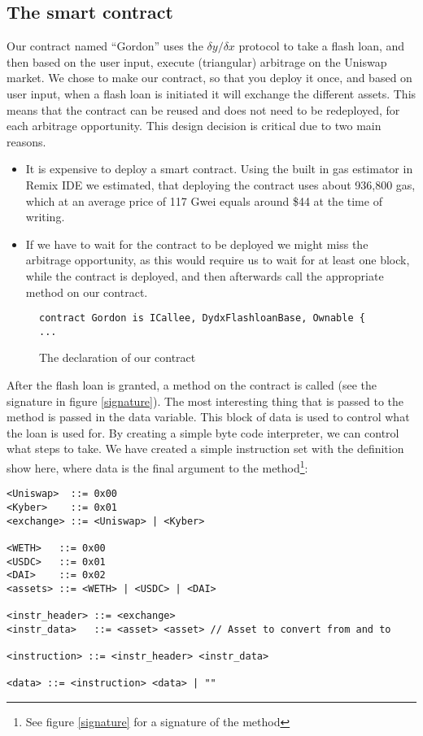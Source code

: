 \subsection{The smart contract}
Our contract named ``Gordon'' uses the $\delta y/\delta x$ protocol to take a
flash loan, and then based on the user input, execute (triangular) arbitrage on
the Uniswap market. We chose to make our contract, so that you deploy it once,
and based on user input, when a flash loan is initiated it will exchange the
different assets. This means that the contract can be reused and does not need
to be redeployed, for each arbitrage opportunity. This design decision is
critical due to two main reasons.
\begin{itemize}
    \item It is expensive to deploy a smart contract. Using the built in gas
        estimator in Remix IDE we estimated, that deploying the contract uses
        about 936,800 gas, which at an average price of 117 Gwei equals around
        \$44 at the time of writing.
    \item If we have to wait for the contract to be deployed we might miss the
        arbitrage opportunity, as this would require us to wait for at least one
        block, while the contract is deployed, and then afterwards call the
        appropriate method on our contract.
\end{itemize}

\begin{figure}[h]
    \begin{lstlisting}[language=Solidity]
    contract Gordon is ICallee, DydxFlashloanBase, Ownable { ...\end{lstlisting}
    \caption{The declaration of our contract}
    \label{fig-gordon}
\end{figure}

\noindent After the flash loan is granted, a method on the contract is called (see the
signature in figure \ref{signature}). The most interesting thing that is passed
to the method is passed in the data variable. This block of data is used to
control what the loan is used for. By creating a simple byte code interpreter,
we can control what steps to take. We have created a simple instruction set with
the definition show here, where data is the final argument to the
method\footnote{See figure \ref{signature} for a signature of the method}:

\begin{samepage}
\begin{verbatim}
<Uniswap>  ::= 0x00
<Kyber>    ::= 0x01
<exchange> ::= <Uniswap> | <Kyber>

<WETH>   ::= 0x00
<USDC>   ::= 0x01
<DAI>    ::= 0x02
<assets> ::= <WETH> | <USDC> | <DAI>

<instr_header> ::= <exchange>
<instr_data>   ::= <asset> <asset> // Asset to convert from and to

<instruction> ::= <instr_header> <instr_data>

<data> ::= <instruction> <data> | ""
\end{verbatim}
\end{samepage}

